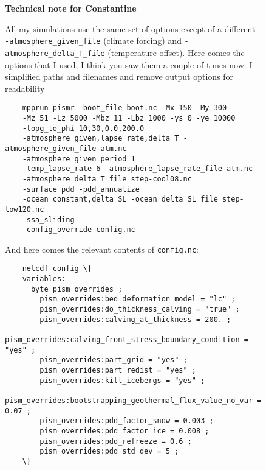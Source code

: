 \begin{figure}\begin{framed}
	\textbf{Technical note for Constantine}

	All my simulations use the same set of options except of a different \verb|-atmosphere_given_file| (climate forcing) and \verb|-atmosphere_delta_T_file| (temperature offset). Here comes the options that I used; I think you saw them a couple of times now. I simplified paths and filenames and remove output options for readability

	\begin{verbatim}
	mpprun pismr -boot_file boot.nc -Mx 150 -My 300
	-Mz 51 -Lz 5000 -Mbz 11 -Lbz 1000 -ys 0 -ye 10000
	-topg_to_phi 10,30,0.0,200.0
	-atmosphere given,lapse_rate,delta_T -atmosphere_given_file atm.nc
	-atmosphere_given_period 1
	-temp_lapse_rate 6 -atmosphere_lapse_rate_file atm.nc
	-atmosphere_delta_T_file step-cool08.nc
	-surface pdd -pdd_annualize
	-ocean constant,delta_SL -ocean_delta_SL_file step-low120.nc
	-ssa_sliding
	-config_override config.nc
	\end{verbatim}

	And here comes the relevant contents of \verb|config.nc|:

	\begin{verbatim}
	netcdf config \{
	variables:
	  byte pism_overrides ;
	    pism_overrides:bed_deformation_model = "lc" ;
	    pism_overrides:do_thickness_calving = "true" ;
	    pism_overrides:calving_at_thickness = 200. ;
	    pism_overrides:calving_front_stress_boundary_condition = "yes" ;
	    pism_overrides:part_grid = "yes" ;
	    pism_overrides:part_redist = "yes" ;
	    pism_overrides:kill_icebergs = "yes" ;
	    pism_overrides:bootstrapping_geothermal_flux_value_no_var = 0.07 ;
	    pism_overrides:pdd_factor_snow = 0.003 ;
	    pism_overrides:pdd_factor_ice = 0.008 ;
	    pism_overrides:pdd_refreeze = 0.6 ;
	    pism_overrides:pdd_std_dev = 5 ;
	\}
 
	\end{verbatim}

\end{framed}\end{figure}

